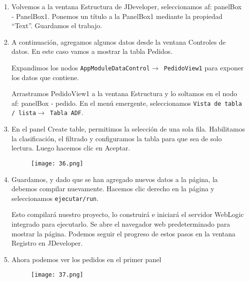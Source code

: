 \begin{enumerate}
	\item Volvemos a la ventana Estructura de JDeveloper, seleccionamos af: panelBox - PanelBox1. Ponemos un título a la PanelBox1 mediante la propiedad ``Text''. Guardamos el trabajo.
	\item A continuación, agregamos algunos datos desde la ventana Controles de datos. En este caso vamos a mostrar la tabla Pedidos.

	Expandimos los nodos \texttt{AppModuleDataControl$\rightarrow$ PedidoView1} para exponer los datos que contiene.

	Arrastramos PedidoView1 a la ventana Estructura y lo soltamos en el nodo af: panelBox - pedido. En el menú emergente, seleccionamos \texttt{Vista de tabla / lista$\rightarrow$ Tabla ADF}.
	\item En el panel Create table, permitimos la selección de una sola fila. Habilitamos la clasificación, el filtrado y configuramos la tabla para que sea de solo lectura. Luego hacemos  clic en Aceptar.
	\begin{figure}[!h]
	  \centering
	    \texttt{[image: 36.png]}
	\end{figure}
	\item Guardamos, y dado que se han agregado nuevos datos a la página, la debemos compilar nuevamente. Hacemos clic derecho en la página y seleccionamos \texttt{ejecutar/run}.

	Esto compilará nuestro proyecto, lo construirá e iniciará el servidor WebLogic integrado para ejecutarlo. Se abre el navegador web predeterminado para mostrar la página. Podemos seguir el progreso de estos pasos en la ventana Registro en JDeveloper.

	\item Ahora podemos ver los pedidos en el primer panel
	\pagebreak
	\begin{figure}[!h]
	  \centering
	    \texttt{[image: 37.png]}
	\end{figure}


\end{enumerate}
